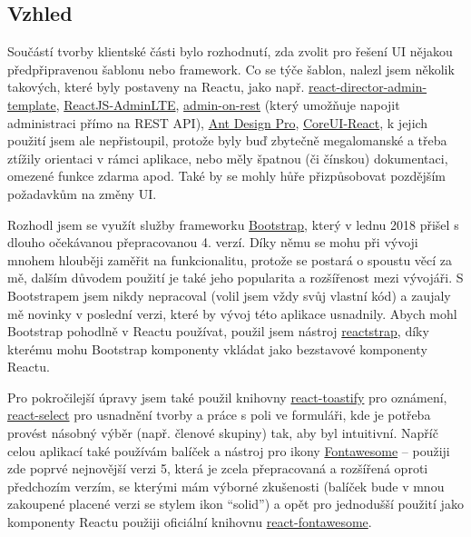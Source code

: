     \subsection{Vzhled}
    Součástí tvorby klientské části bylo rozhodnutí, zda zvolit pro řešení UI nějakou předpřipravenou šablonu nebo framework. Co se týče šablon, nalezl jsem několik takových, které byly postaveny na Reactu, jako např. \href{https://github.com/MacKentoch/react-director-admin-template}{react-director-admin-template}, \href{https://github.com/booleanhunter/ReactJS-AdminLTE}{ReactJS-AdminLTE},
    \href{https://github.com/marmelab/admin-on-rest}{admin-on-rest} (který umožňuje napojit administraci přímo na REST API),
    \href{https://github.com/ant-design/ant-design-pro/}{Ant Design Pro},
    \href{https://github.com/mrholek/CoreUI-React}{CoreUI-React}, k jejich použití jsem ale nepřistoupil, protože byly buď zbytečně megalomanské a třeba ztížily orientaci v rámci aplikace, nebo měly špatnou (či čínskou) dokumentaci, omezené funkce zdarma apod. Také by se mohly hůře přizpůsobovat pozdějším požadavkům na změny UI.
    
    Rozhodl jsem se využít služby frameworku \href{https://getbootstrap.com}{Bootstrap}, který v lednu 2018 přišel s dlouho očekávanou přepracovanou 4. verzí. Díky němu se mohu při vývoji mnohem hlouběji zaměřit na funkcionalitu, protože se postará o spoustu věcí za mě, dalším důvodem použití je také jeho popularita a rozšířenost \cite{bootstrap} mezi vývojáři. S Bootstrapem jsem nikdy nepracoval (volil jsem vždy svůj vlastní kód) a zaujaly mě novinky v poslední verzi, které by vývoj této aplikace usnadnily. Abych mohl Bootstrap pohodlně v Reactu používat, použil jsem nástroj \href{https://github.com/reactstrap/reactstrap}{reactstrap}, díky kterému mohu Bootstrap komponenty vkládat jako bezstavové komponenty Reactu.
    
    Pro pokročilejší úpravy jsem také použil knihovny \href{https://github.com/fkhadra/react-toastify}{react-toastify} pro oznámení, \href{https://github.com/JedWatson/react-select}{react-select} pro usnadnění tvorby a práce s poli ve formuláři, kde je potřeba provést násobný výběr (např. členové skupiny) tak, aby byl intuitivní. Napříč celou aplikací také používám balíček a nástroj pro ikony \href{https://fontawesome.com/}{Fontawesome} -- použiji zde poprvé nejnovější verzi 5, která je zcela přepracovaná a rozšířená oproti předchozím verzím, se kterými mám výborné zkušenosti (balíček bude v mnou zakoupené placené verzi se stylem ikon \enquote{solid}) a opět pro jednodušší použití jako komponenty Reactu použiji oficiální knihovnu \href{https://github.com/FortAwesome/react-fontawesome}{react-fontawesome}.
    
